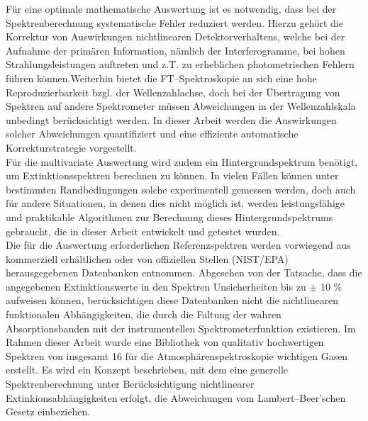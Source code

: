 F\"{u}r eine optimale mathematische Auswertung ist es notwendig, dass
bei der Spektrenberechnung systematische Fehler reduziert werden.
Hierzu geh\"{o}rt die Korrektur von Auswirkungen nichtlinearen
Detektorverhaltens, welche bei der Aufnahme der prim\"{a}ren
Information, n\"{a}mlich der Interferogramme, bei hohen
Strahlungsleistungen auftreten und z.T. zu erheblichen
photometrischen Fehlern f\"{u}hren k\"{o}nnen.Weiterhin bietet die
FT--Spektroskopie an sich eine hohe Reproduzierbarkeit bzgl. der
Wellenzahlachse, doch bei der \"{U}bertragung von Spektren auf andere
Spektrometer m\"{u}ssen Abweichungen in der Wellenzahlskala unbedingt
ber\"{u}cksichtigt werden. In dieser Arbeit werden die Auswirkungen
solcher Abweichungen quantifiziert und eine effiziente
automatische Korrekturstrategie vorgestellt.\\

F\"{u}r die multivariate Auswertung wird zudem ein Hintergrundspektrum
ben\"{o}tigt, um Extinktionsspektren berechnen zu k\"{o}nnen. In vielen
F\"{a}llen k\"{o}nnen unter bestimmten Randbedingungen solche
experimentell gemessen werden, doch auch f\"{u}r andere Situationen,
in denen dies nicht m\"{o}glich ist, werden leistungsf\"{a}hige und
praktikable Algorithmen zur Berechnung dieses Hintergrundspektrums
gebraucht, die in dieser Arbeit entwickelt und getestet wurden.\\

Die f\"{u}r die Auswertung erforderlichen Referenzspektren werden
vorwiegend aus kommerziell erh\"{a}ltlichen oder von offiziellen
Stellen (NIST/EPA) herausgegebenen Datenbanken entnommen.
Abgesehen von der Tatsache, dass die angegebenen Extinktionswerte
in den Spektren Unsicherheiten bis zu $\pm$ 10 \% aufweisen
k\"{o}nnen, ber\"{u}cksichtigen diese Datenbanken nicht die nichtlinearen
funktionalen Abh\"{a}ngigkeiten, die durch die Faltung der wahren
Absorptionsbanden mit der instrumentellen Spektrometerfunktion
existieren. Im Rahmen dieser Arbeit wurde eine Bibliothek von
qualitativ hochwertigen Spektren von insgesamt 16 f\"{u}r die
Atmosph\"{a}renspektroskopie wichtigen Gasen erstellt. Es wird ein
Konzept beschrieben, mit dem eine generelle Spektrenberechnung
unter Ber\"{u}cksichtigung nichtlinearer Extinkionsabh\"{a}ngigkeiten
erfolgt, die Abweichungen vom Lambert--Beer'schen Gesetz
einbeziehen.\\

